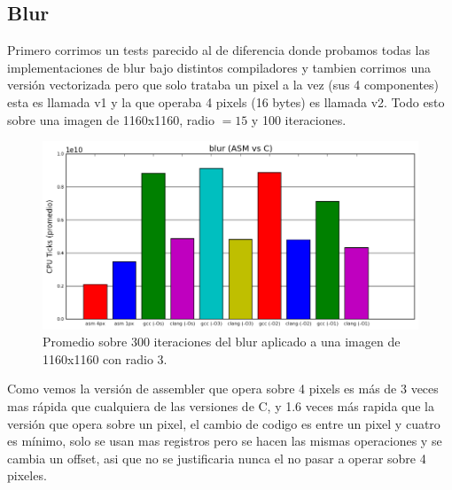\documentclass[a4paper]{article}
\begin{document}
\newpage

\subsection{Blur}
Primero corrimos un tests parecido al de diferencia donde probamos todas las implementaciones de blur bajo distintos compiladores y tambien corrimos una versión vectorizada pero que solo trataba un pixel a la vez (sus 4 componentes) esta es llamada v1 y la que operaba 4 pixels (16 bytes) es llamada v2. Todo esto sobre una imagen de 1160x1160, radio $= 15$ y 100 iteraciones.

\begin{figure}[h]
	\includegraphics[scale=0.75]{imagenes/test_blur_ASM_C_.png}
	\caption{Promedio sobre 300 iteraciones del blur aplicado a una imagen de 1160x1160 con radio 3.}
\end{figure}

Como vemos la versión de assembler que opera sobre 4 pixels es más de 3 veces mas rápida que cualquiera de las versiones de C, y 1.6 veces más rapida que la versión que opera sobre un pixel, el cambio de codigo es entre un pixel y cuatro es mínimo, solo se usan mas registros pero se hacen las mismas operaciones y se cambia un offset, asi que no se justificaria nunca el no pasar a operar sobre 4 pixeles.
\end{document}
